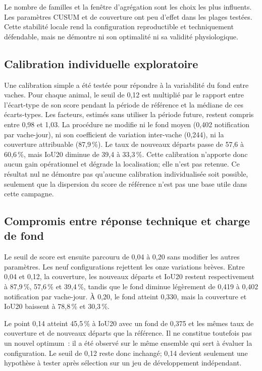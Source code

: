 Le nombre de familles et la fenêtre d'agrégation sont les choix les plus influents. Les
paramètres CUSUM et de couverture ont peu d'effet dans les plages testées. Cette stabilité
locale rend la configuration reproductible et techniquement défendable, mais ne démontre
ni son optimalité ni sa validité physiologique.

\subsection{Calibration individuelle exploratoire}

Une calibration simple a été testée pour répondre à la variabilité du fond entre vaches.
Pour chaque animal, le seuil de 0,12 est multiplié par le rapport entre l'écart-type de son
score pendant la période de référence et la médiane de ces écarts-types. Les facteurs, estimés sans utiliser la
période future, restent compris entre 0,98 et 1,03. La procédure ne modifie ni le fond moyen
(0,402 notification par vache-jour), ni son coefficient de variation inter-vache (0,244),
ni la couverture attribuable (87,9\,\%). Le taux de nouveaux départs passe de 57,6 à
60,6\,\%, mais IoU20 diminue de 39,4 à 33,3\,\%. Cette calibration n'apporte donc aucun gain
opérationnel et dégrade la localisation; elle n'est pas retenue. Ce résultat nul ne démontre
pas qu'aucune calibration individualisée soit possible, seulement que la dispersion du
score de référence n'est pas une base utile dans cette campagne.

\subsection{Compromis entre réponse technique et charge de fond}

Le seuil de score est ensuite parcouru de 0,04 à 0,20 sans modifier les autres paramètres.
Les neuf configurations rejettent les onze variations brèves. Entre 0,04 et 0,12, la
couverture, les nouveaux départs et IoU20 restent respectivement à 87,9\,\%, 57,6\,\% et
39,4\,\%, tandis que le fond diminue légèrement de 0,419 à 0,402 notification par
vache-jour. À 0,20, le fond atteint 0,330, mais la couverture et IoU20 baissent à 78,8\,\%
et 30,3\,\%.

Le point 0,14 atteint 45,5\,\% à IoU20 avec un fond de 0,375 et les mêmes taux de couverture
et de nouveaux départs que la référence. Il ne constitue toutefois pas un nouvel optimum~:
il a été observé sur le même ensemble qui sert à évaluer la configuration. Le seuil de 0,12
reste donc inchangé; 0,14 devient seulement une hypothèse à tester après sélection sur un
jeu de développement indépendant.

